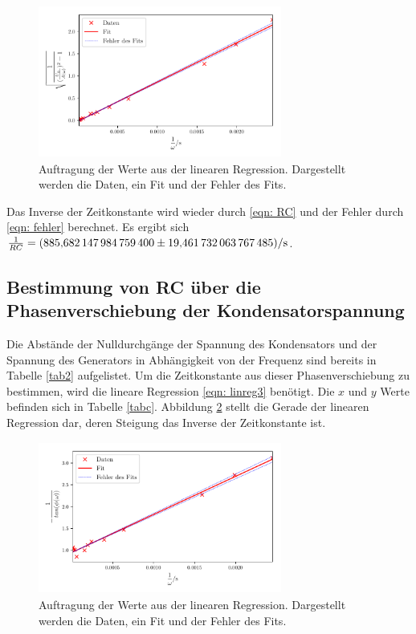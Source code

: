 \begin{figure}
  \centering
  \includegraphics[width=8cm, height=5cm]{build/plotb.pdf}
  \caption{Auftragung der Werte aus der linearen Regression. Dargestellt werden die Daten, ein Fit und der Fehler des Fits.}
  \label{fig:plotb}
\end{figure}

Das Inverse der Zeitkonstante wird wieder durch \eqref{eqn: RC} und der Fehler durch \eqref{eqn: fehler}
berechnet. Es ergibt sich $\frac{1}{RC} = \SI{885.6821479847594  \pm 19.461732063767485}{\per\second}$.

\subsection{Bestimmung von RC über die Phasenverschiebung der Kondensatorspannung}
\label{sec: c}
Die Abstände der Nulldurchgänge der Spannung des Kondensators und der Spannung des Generators in Abhängigkeit
von der Frequenz sind bereits in Tabelle \ref{tab2} aufgelistet.
Um die Zeitkonstante aus dieser Phasenverschiebung zu bestimmen, wird die lineare Regression \eqref{eqn: linreg3} benötigt.
Die $x$ und $y$ Werte befinden sich in Tabelle \ref{tabc}. Abbildung \ref{fig:plotc} stellt die Gerade der
linearen Regression dar, deren Steigung das Inverse der Zeitkonstante ist.


\begin{figure}
  \centering
  \includegraphics[width=8cm, height=5cm]{build/plotc.pdf}
  \caption{Auftragung der Werte aus der linearen Regression. Dargestellt werden die Daten, ein Fit und der Fehler des Fits.}
  \label{fig:plotc}
\end{figure}

